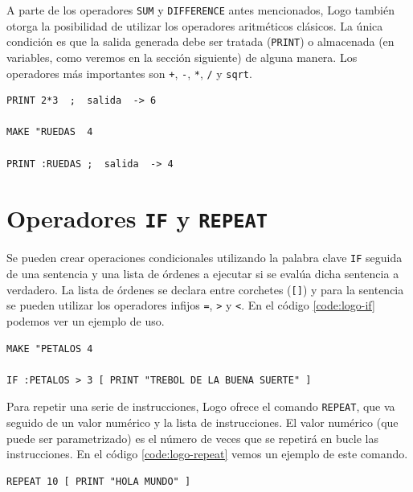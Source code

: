 A parte de los operadores \texttt{SUM} y \texttt{DIFFERENCE} antes mencionados, Logo también otorga la posibilidad de utilizar los operadores aritméticos clásicos. La única condición es que la salida generada debe ser tratada (\texttt{PRINT}) o almacenada (en variables, como veremos en la sección siguiente) de alguna manera. Los operadores más importantes son \texttt{+}, \texttt{-}, \texttt{*}, \texttt{/} y \texttt{sqrt}.

\begin{lstlisting}[language={Logo}, label={code:logo-operadores-aritmeticos}, caption=Ejemplo de uso de operadores aritméticos en el lenguaje Logo.]
PRINT 2*3  ;  salida  -> 6

MAKE "RUEDAS  4

PRINT :RUEDAS ;  salida  -> 4
\end{lstlisting}


\section*{Operadores \texttt{IF} y \texttt{REPEAT}}

Se pueden crear operaciones condicionales utilizando la palabra clave \texttt{IF} seguida de una sentencia y una lista de órdenes a ejecutar si se evalúa dicha sentencia a verdadero. La lista de órdenes se declara entre corchetes (\texttt{[]}) y para la sentencia se pueden utilizar los operadores infijos \texttt{=}, \texttt{>} y \texttt{<}. En el código \ref{code:logo-if} podemos ver un ejemplo de uso.

\begin{lstlisting}[language=Logo,label={code:logo-if}, caption=Condiciones en el lenguaje logo con el operador \texttt{IF}.]
MAKE "PETALOS 4

IF :PETALOS > 3 [ PRINT "TREBOL DE LA BUENA SUERTE" ]
\end{lstlisting}

Para repetir una serie de instrucciones, Logo ofrece el comando \texttt{REPEAT}, que va seguido de un valor numérico y la lista de instrucciones. El valor numérico (que puede ser parametrizado) es el número de veces que se repetirá en bucle las instrucciones. En el código \ref{code:logo-repeat} vemos un ejemplo de este comando.


\begin{lstlisting}[language=Logo,label={code:logo-repeat}, caption=Condiciones en el lenguaje logo con el operador \texttt{IF}.]
REPEAT 10 [ PRINT "HOLA MUNDO" ]
\end{lstlisting}





